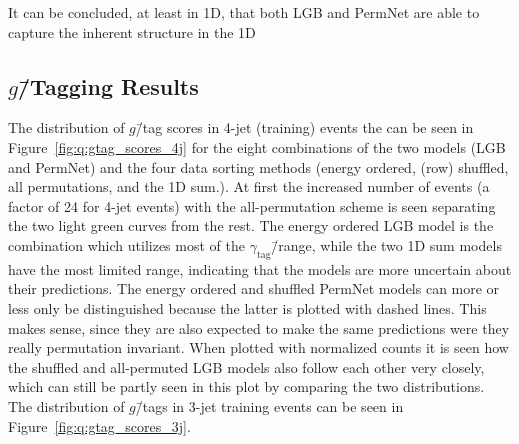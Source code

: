 It can be concluded, at least in 1D, that both LGB and PermNet are able to capture the inherent structure in the 1D


\subsection{$g$\=/Tagging Results}

The distribution of $g$\=/tag scores in 4-jet (training) events the can be seen in Figure~\ref{fig:q:gtag_scores_4j} for the eight combinations of the two models (LGB and PermNet) and the four data sorting methods (energy ordered, (row) shuffled, all permutations, and the 1D sum.). At first the increased number of events (a factor of \num{24} for 4-jet events) with the all-permutation scheme is seen separating the two light green curves from the rest. The energy ordered LGB model is the combination which utilizes most of the $\gamma_\mathrm{tag}$\=/range, while the two 1D sum models have the most limited range, indicating that the models are more uncertain about their predictions. The energy ordered and shuffled PermNet models can more or less only be distinguished because the latter is plotted with dashed lines. This makes sense, since they are also expected to make the same predictions were they really permutation invariant. When plotted with normalized counts it is seen how the shuffled and all-permuted LGB models also follow each other very closely, which can still be partly seen in this plot by comparing the two distributions. The distribution of $g$\=/tags in 3-jet training events can be seen in Figure~\ref{fig:q:gtag_scores_3j}. 

